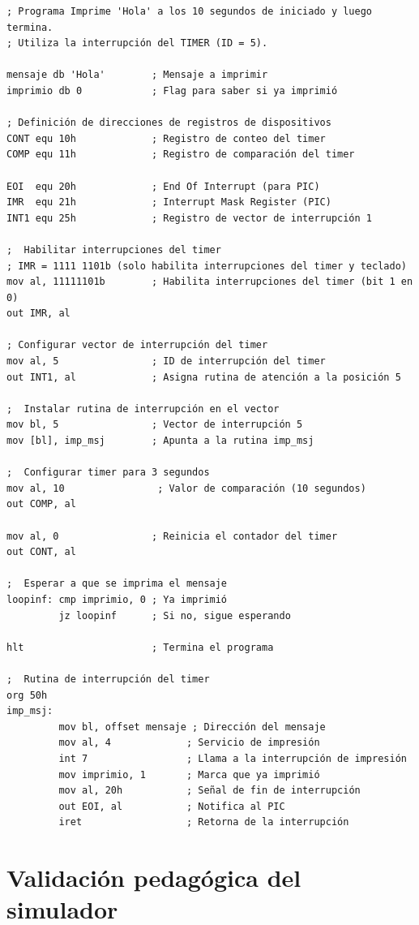 \documentclass[12pt,oneside]{templates/unerthesis}
\begin{document}
\begin{lstlisting}
; Programa Imprime 'Hola' a los 10 segundos de iniciado y luego termina.
; Utiliza la interrupción del TIMER (ID = 5).

mensaje db 'Hola'        ; Mensaje a imprimir
imprimio db 0            ; Flag para saber si ya imprimió

; Definición de direcciones de registros de dispositivos
CONT equ 10h             ; Registro de conteo del timer
COMP equ 11h             ; Registro de comparación del timer

EOI  equ 20h             ; End Of Interrupt (para PIC)
IMR  equ 21h             ; Interrupt Mask Register (PIC)
INT1 equ 25h             ; Registro de vector de interrupción 1

;  Habilitar interrupciones del timer 
; IMR = 1111 1101b (solo habilita interrupciones del timer y teclado)
mov al, 11111101b        ; Habilita interrupciones del timer (bit 1 en 0)
out IMR, al

; Configurar vector de interrupción del timer 
mov al, 5                ; ID de interrupción del timer
out INT1, al             ; Asigna rutina de atención a la posición 5

;  Instalar rutina de interrupción en el vector 
mov bl, 5                ; Vector de interrupción 5
mov [bl], imp_msj        ; Apunta a la rutina imp_msj

;  Configurar timer para 3 segundos 
mov al, 10                ; Valor de comparación (10 segundos)
out COMP, al

mov al, 0                ; Reinicia el contador del timer
out CONT, al

;  Esperar a que se imprima el mensaje 
loopinf: cmp imprimio, 0 ; Ya imprimió
         jz loopinf      ; Si no, sigue esperando

hlt                      ; Termina el programa

;  Rutina de interrupción del timer 
org 50h
imp_msj:
         mov bl, offset mensaje ; Dirección del mensaje
         mov al, 4             ; Servicio de impresión
         int 7                 ; Llama a la interrupción de impresión
         mov imprimio, 1       ; Marca que ya imprimió
         mov al, 20h           ; Señal de fin de interrupción
         out EOI, al           ; Notifica al PIC
         iret                  ; Retorna de la interrupción\end{lstlisting}

\hypertarget{validaciuxf3n-pedaguxf3gica-del-simulador}{%
\section{Validación pedagógica del simulador}\label{validaciuxf3n-pedaguxf3gica-del-simulador}}
\end{document}
